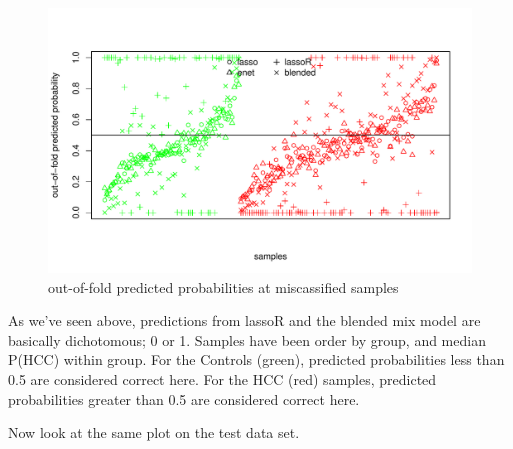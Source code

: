 \documentclass[
]{book}
\begin{document}
\begin{figure}
\centering
\includegraphics{Static/figures/hcc5hmC-glmnetFit-misclassTrain-1.pdf}
\caption{\label{fig:hcc5hmC-glmnetFit-misclassTrain}out-of-fold predicted probabilities at miscassified samples}
\end{figure}

As we've seen above, predictions from lassoR and the blended mix model
are basically dichotomous; 0 or 1. Samples have been order by group, and
median P(HCC) within group. For the Controls (green), predicted probabilities
less than 0.5 are considered correct here. For the HCC (red) samples,
predicted probabilities greater than 0.5 are considered correct here.

Now look at the same plot on the test data set.
\end{document}
